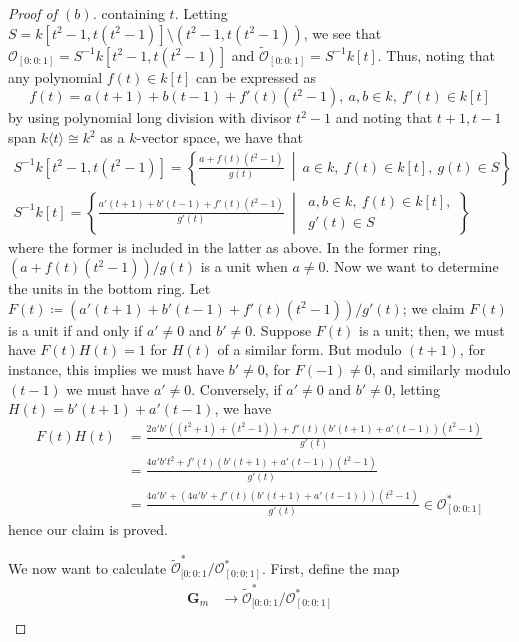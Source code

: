 \documentclass[10pt]{article}
\theoremstyle{definition}
\theoremstyle{remark}
\numberwithin{equation}{section}
\numberwithin{figure}{subsubsection}
\newcommand{\OO}{\mathcal{O}}
\begin{document}
\begin{proof}[Proof of $(b)$]
  containing $t$. Letting $S = k[t^2-1,t(t^2-1)] \setminus (t^2-1,t(t^2-1))$, we
  see that $\OO_{[0:0:1]} = S^{-1}k[t^2-1,t(t^2-1)]$ and $\tilde{\OO}_{[0:0:1]}
  = S^{-1}k[t]$. Thus, noting that any polynomial $f(t) \in k[t]$ can be expressed
  as
  \begin{equation*}
    f(t) = a(t+1) + b(t-1) + f'(t)(t^2-1), \ a,b \in k,\ f'(t) \in k[t]
  \end{equation*}
  by using polynomial long division with divisor $t^2-1$ and noting that
  $t+1,t-1$ span $k\langle t \rangle \cong k^2$ as a $k$-vector space, we have that
  \begin{gather*}
    S^{-1}k[t^2-1,t(t^2-1)] = \left\{
    \frac{a + f(t)(t^2-1)}{g(t)}\ \middle\vert\ a \in k,\ f(t) \in k[t],\ g(t)
    \in S \right\}\\
    S^{-1}k[t] = \left\{
    \frac{a'(t+1) + b'(t-1) + f'(t)(t^2-1)}{g'(t)}\ \middle\vert\
    \begin{gathered}
      a,b \in k,\ f(t) \in k[t],\\ g'(t) \in S\end{gathered}\right\}
  \end{gather*}
  where the former is included in the latter as above. In the former ring,
  $(a + f(t)(t^2-1))/g(t)$ is a unit when $a \ne 0$. Now we want to determine
  the units in the bottom ring. Let $F(t) \coloneqq (a'(t+1) + b'(t-1) +
  f'(t)(t^2-1))/g'(t)$; we claim $F(t)$ is a unit if and only if $a' \ne 0$ and
  $b' \ne 0$. Suppose $F(t)$ is a unit; then, we must have $F(t)H(t) = 1$ for
  $H(t)$ of a similar form. But modulo $(t+1)$, for instance, this implies we
  must have $b' \ne 0$, for $F(-1) \ne 0$, and similarly modulo $(t-1)$ we must
  have $a' \ne 0$. Conversely, if $a' \ne 0$ and $b' \ne 0$, letting $H(t) =
  b'(t+1) + a'(t-1)$, we have
  \begin{align*}
    F(t)H(t) &= \frac{2a'b'((t^2+1) + (t^2-1)) + f'(t)(b'(t+1) +
    a'(t-1))(t^2-1)}{g'(t)}\\
    &= \frac{4a'b't^2 + f'(t)(b'(t+1) + a'(t-1))(t^2-1)}{g'(t)}\\
    &= \frac{4a'b' + (4a'b' + f'(t)(b'(t+1) + a'(t-1)))(t^2-1)}{g'(t)} \in
    \OO^*_{[0:0:1]}
  \end{align*}
  hence our claim is proved.
  \par We now want to calculate $\tilde{\OO}_{[0:0:1}^*/\OO_{[0:0:1]}^*$. First,
  define the map
  \begin{align*}
    \mathbf{G}_m &\longrightarrow \tilde{\OO}_{[0:0:1}^*/\OO_{[0:0:1]}^*\\

\end{align*}
\end{proof}
\end{document}
